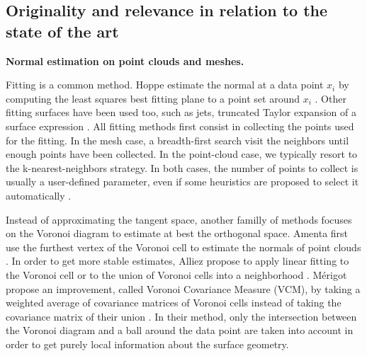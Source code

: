 

\subsection{Originality and relevance in relation to the state of the art}



\noindent\textbf{Normal estimation on point clouds and meshes.}

Fitting is a common method. Hoppe \etal estimate the normal at a data point $x_i$
by computing the least squares best fitting plane to a point set around $x_i$ \cite{Hoppe1992}.
Other fitting surfaces have been used too, such as jets, \ie truncated Taylor expansion
of a surface expression \cite{Cazals2005,Cazals2008}. 
All fitting methods first consist in collecting the points used for the fitting.
In the mesh case, a breadth-first search visit the neighbors until enough points
have been collected. In the point-cloud case, we typically resort to the k-nearest-neighbors
strategy. In both cases, the number of points to collect is usually a user-defined parameter,
even if some heuristics are proposed to select it automatically \cite{Hoppe1992,Cazals2005}.  

Instead of approximating the tangent space, another familly of methods focuses on the
Voronoi diagram to estimate at best the orthogonal space. Amenta \etal first use the
furthest vertex of the Voronoi cell to estimate the normals of point clouds \cite{Amenta1999}.
In order to get more stable estimates, Alliez \etal propose to apply linear fitting
to the Voronoi cell or to the union of Voronoi cells into a neighborhood \cite{Alliez2007}. 
Mérigot \etal propose an improvement, called Voronoi Covariance Measure (VCM),
by taking a weighted average of covariance matrices of Voronoi cells instead of
taking the covariance matrix of their union \cite{Merigot2011}. In their method,
only the intersection between the Voronoi diagram and a ball around the data point
are taken into account in order to get purely local information about the surface geometry.

